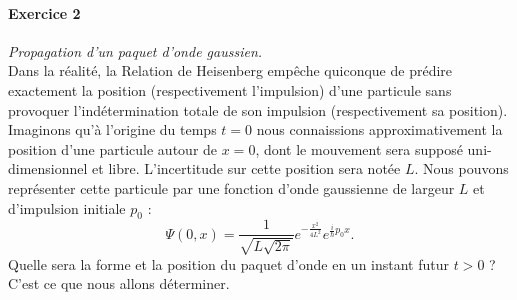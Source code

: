 \newpage
\paragraph{Exercice 2} \textit{Propagation d'un paquet d'onde gaussien.} \\
Dans la réalité, la Relation de Heisenberg empêche quiconque de prédire exactement la position (respectivement l'impulsion) d'une particule sans provoquer l'indétermination totale de son impulsion (respectivement sa position). Imaginons qu'à l'origine du temps $t=0$ nous connaissions approximativement la position d'une particule autour de $x=0$, dont le mouvement sera supposé uni-dimensionnel et libre. L'incertitude sur cette position sera notée $L$. Nous pouvons représenter cette particule par une fonction d'onde gaussienne de largeur $L$ et d'impulsion initiale $p_0$ :
\begin{equation}
\Psi(0,x) = \frac{1}{\sqrt{L\sqrt{2\pi}}} e^{-\frac{x^2}{4L^2}} e^{\frac{i}{\hbar} p_0 x}.
\end{equation}	
Quelle sera la forme et la position du paquet d'onde en un instant futur $t>0$ ? C'est ce que nous allons déterminer.
